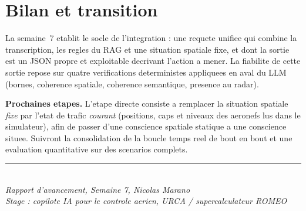 \documentclass[11pt,a4paper]{article}
\begin{document}
\section{Bilan et transition}

La semaine~7 etablit le socle de l'integration : une requete unifiee qui combine la
transcription, les regles du RAG et une situation spatiale fixe, et dont la sortie est
un JSON propre et exploitable decrivant l'action a mener. La fiabilite de cette sortie
repose sur quatre verifications deterministes appliquees en aval du LLM (bornes,
coherence spatiale, coherence semantique, presence au radar).

\medskip
\noindent\textbf{Prochaines etapes.} L'etape directe consiste a remplacer la situation
spatiale \emph{fixe} par l'etat de trafic \emph{courant} (positions, caps et niveaux
des aeronefs lus dans le simulateur), afin de passer d'une conscience spatiale
statique a une conscience situee. Suivront la consolidation de la boucle temps reel
de bout en bout et une evaluation quantitative sur des scenarios complets.

\vfill
\begin{center}
\small\color{atcblue}\rule{0.5\textwidth}{0.6pt}\\[4pt]
\textit{Rapport d'avancement, Semaine 7, Nicolas Marano}\\
\textit{Stage : copilote IA pour le controle aerien, URCA / supercalculateur ROMEO}
\end{center}
\end{document}
